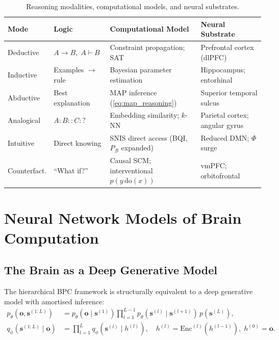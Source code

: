 \documentclass[12pt,a4paper]{article}
\theoremstyle{plain}
\theoremstyle{definition}
\theoremstyle{remark}
\newcommand{\vB}{\mathcal{B}}
\begin{document}
\begin{table}[htbp]
\centering
\caption{Reasoning modalities, computational models, and neural substrates.}
\label{tab:reasoning}
\renewcommand{\arraystretch}{1.3}
\begin{tabular}{p{2.2cm}p{2.8cm}p{3.8cm}p{3.8cm}}
\toprule
\rowcolor{hdrcol}
\color{white}\textbf{Mode} &
\color{white}\textbf{Logic} &
\color{white}\textbf{Computational Model} &
\color{white}\textbf{Neural Substrate} \\
\midrule
Deductive  & $A\to B,\;A \vdash B$       & Constraint propagation; SAT        & Prefrontal cortex (dlPFC) \\
Inductive  & Examples $\to$ rule         & Bayesian parameter estimation      & Hippocampus; entorhinal \\
Abductive  & Best explanation            & MAP inference (\cref{eq:map_reasoning}) & Superior temporal sulcus \\
Analogical & $A:B :: C:?$                & Embedding similarity; $k$-NN       & Parietal cortex; angular gyrus \\
Intuitive  & Direct knowing             & SNIS direct access (BQI, $P_\vB$ expanded) & Reduced DMN; $\Phi$ surge \\
Counterfact.& ``What if?''               & Causal SCM; interventional $p(y\,\mathrm{do}(x))$ & vmPFC; orbitofrontal \\
\bottomrule
\end{tabular}
\end{table}

\section{Neural Network Models of Brain Computation}
\label{sec:nn}

\subsection{The Brain as a Deep Generative Model}

The hierarchical BPC framework is structurally equivalent to a deep generative model with amortised inference:
\begin{align}
p_\theta(\mathbf{o},\mathbf{s}^{(1:L)}) &= p_\theta(\mathbf{o}\mid\mathbf{s}^{(1)})
\prod_{l=1}^{L-1}p_\theta(\mathbf{s}^{(l)}\mid\mathbf{s}^{(l+1)})\,p(\mathbf{s}^{(L)}), \label{eq:gen}\\
q_\phi(\mathbf{s}^{(1:L)}\mid\mathbf{o}) &= \prod_{l=1}^L q_\phi(\mathbf{s}^{(l)}\mid h^{(l)}),\quad
h^{(l)} = \mathrm{Enc}^{(l)}(h^{(l-1)}),\;h^{(0)}=\mathbf{o}. \label{eq:inf}
\end{align}
\end{document}
